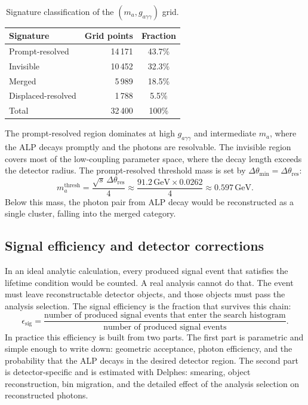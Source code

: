 \documentclass[12pt,a4paper]{article}
\newcommand{\alp}{a}
\newcommand{\gagg}{g_{a\gamma\gamma}}
\newcommand{\ma}{m_a}
\newcommand{\sqrts}{\sqrt{s}}
\newcommand{\GeV}{\,\text{GeV}}
\begin{document}
\begin{table}[h]
    \centering
    \caption{Signature classification of the $(m_\alp, \gagg)$ grid.}
    \label{tab:classification}
    \begin{tabular}{lrc}
        \toprule
        Signature & Grid points & Fraction \\
        \midrule
        Prompt-resolved & 14\,171 & 43.7\% \\
        Invisible        & 10\,452 & 32.3\% \\
        Merged           &  5\,989 & 18.5\% \\
        Displaced-resolved & 1\,788 &  5.5\% \\
        \midrule
        Total & 32\,400 & 100\% \\
        \bottomrule
    \end{tabular}
\end{table}

The prompt-resolved region dominates at high $\gagg$ and intermediate $\ma$,
where the ALP decays promptly and the photons are resolvable.
The invisible region covers most of the low-coupling parameter space, where
the decay length exceeds the detector radius.
The prompt-resolved threshold mass is set by
$\Delta\theta_\mathrm{min} = \Delta\theta_\mathrm{res}$:
\begin{equation}
    m_\alp^\mathrm{thresh} = \frac{\sqrts\,\Delta\theta_\mathrm{res}}{4}
    \approx \frac{91.2\GeV \times 0.0262}{4} \approx 0.597\GeV.
    \label{eq:threshold}
\end{equation}
Below this mass, the photon pair from ALP decay would be reconstructed as a
single cluster, falling into the merged category.

\subsection{Signal efficiency and detector corrections}

In an ideal analytic calculation, every produced signal event that satisfies
the lifetime condition would be counted. A real analysis cannot do that. The
event must leave reconstructable detector objects, and those objects must pass
the analysis selection. The signal efficiency is the fraction that survives
this chain:
\begin{equation}
    \epsilon_\mathrm{sig}
    =
    \frac{
        \text{number of produced signal events that enter the search histogram}
    }{
        \text{number of produced signal events}
    }.
    \label{eq:efficiency_definition}
\end{equation}
In practice this efficiency is built from two parts. The first part is
parametric and simple enough to write down: geometric acceptance, photon
efficiency, and the probability that the ALP decays in the desired detector
region. The second part is detector-specific and is estimated with Delphes:
smearing, object reconstruction, bin migration, and the detailed effect of the
analysis selection on reconstructed photons.
\end{document}
